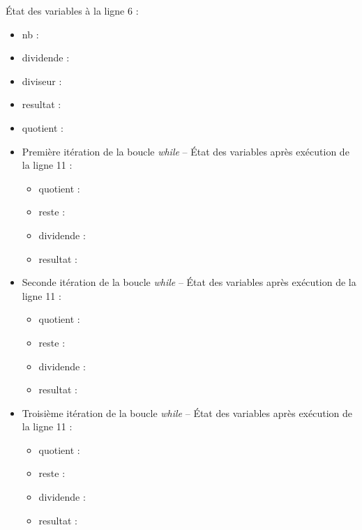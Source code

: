 \documentclass[10pt]{article}
\begin{document}
État des variables à la ligne 6 :
\begin{itemize}
\item \textsf{nb} : \dotfill
\item \textsf{dividende} : \dotfill
\item \textsf{diviseur} : \dotfill
\item \textsf{resultat} : \dotfill
\item \textsf{quotient} : \dotfill
\end{itemize}

\vspace{.5cm}
\begin{itemize}
\item Première itération de la boucle \textsl{while} -- État des variables après exécution de la ligne 11 :
\begin{itemize}
\item \textsf{quotient} : \dotfill
\item \textsf{reste} : \dotfill
\item \textsf{dividende} : \dotfill
\item \textsf{resultat} : \dotfill
\end{itemize}
\end{itemize}

\vspace{.5cm}
\begin{itemize}
\item Seconde itération de la boucle \textsl{while} -- État des variables après exécution de la ligne 11 :
\begin{itemize}
\item \textsf{quotient} : \dotfill
\item \textsf{reste} : \dotfill
\item \textsf{dividende} : \dotfill
\item \textsf{resultat} : \dotfill
\end{itemize}
\end{itemize}


\vspace{.5cm}
\begin{itemize}
\item Troisième itération de la boucle \textsl{while} -- État des variables après exécution de la ligne 11 :
\begin{itemize}
\item \textsf{quotient} : \dotfill
\item \textsf{reste} : \dotfill
\item \textsf{dividende} : \dotfill
\item \textsf{resultat} : \dotfill
\end{itemize}
\end{itemize}
\end{document}
